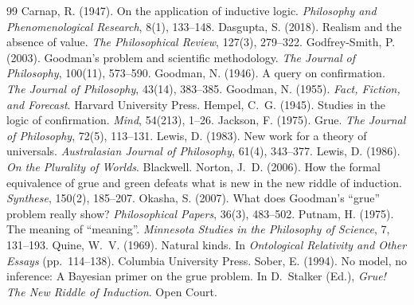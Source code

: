 \documentclass{situationist-preprint}
\begin{document}
\begin{thebibliography}{99}\small
{} Carnap, R. (1947). On the application of inductive logic. \emph{Philosophy and Phenomenological Research}, 8(1), 133--148.
 Dasgupta, S. (2018). Realism and the absence of value. \emph{The Philosophical Review}, 127(3), 279--322.
 Godfrey-Smith, P. (2003). Goodman's problem and scientific methodology. \emph{The Journal of Philosophy}, 100(11), 573--590.
 Goodman, N. (1946). A query on confirmation. \emph{The Journal of Philosophy}, 43(14), 383--385.
 Goodman, N. (1955). \emph{Fact, Fiction, and Forecast}. Harvard University Press.
 Hempel, C.~G. (1945). Studies in the logic of confirmation. \emph{Mind}, 54(213), 1--26.
 Jackson, F. (1975). Grue. \emph{The Journal of Philosophy}, 72(5), 113--131.
 Lewis, D. (1983). New work for a theory of universals. \emph{Australasian Journal of Philosophy}, 61(4), 343--377.
 Lewis, D. (1986). \emph{On the Plurality of Worlds}. Blackwell.
 Norton, J.~D. (2006). How the formal equivalence of grue and green defeats what is new in the new riddle of induction. \emph{Synthese}, 150(2), 185--207.
 Okasha, S. (2007). What does Goodman's \enquote{grue} problem really show? \emph{Philosophical Papers}, 36(3), 483--502.
 Putnam, H. (1975). The meaning of \enquote{meaning}. \emph{Minnesota Studies in the Philosophy of Science}, 7, 131--193.
 Quine, W.~V. (1969). Natural kinds. In \emph{Ontological Relativity and Other Essays} (pp.~114--138). Columbia University Press.
 Sober, E. (1994). No model, no inference: A Bayesian primer on the grue problem. In D.~Stalker (Ed.), \emph{Grue! The New Riddle of Induction}. Open Court.
\end{thebibliography}
\end{document}
